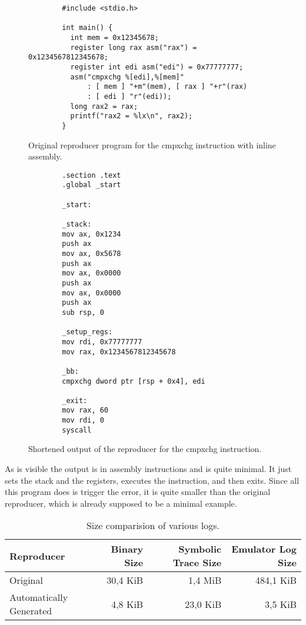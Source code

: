 \begin{figure}[ht]
    \centering
    \begin{verbatim}
        #include <stdio.h>

        int main() {
          int mem = 0x12345678;
          register long rax asm("rax") = 0x1234567812345678;
          register int edi asm("edi") = 0x77777777;
          asm("cmpxchg %[edi],%[mem]"
              : [ mem ] "+m"(mem), [ rax ] "+r"(rax)
              : [ edi ] "r"(edi));
          long rax2 = rax;
          printf("rax2 = %lx\n", rax2);
        }
    \end{verbatim}
    \caption{Original reproducer program for the cmpxchg instruction with inline assembly.}
    \label{fig:c}
\end{figure}

\begin{figure}[ht]
    \centering
    \begin{verbatim}       
        .section .text
        .global _start
        
        _start:
        
        _stack:
        mov ax, 0x1234
        push ax
        mov ax, 0x5678
        push ax
        mov ax, 0x0000
        push ax
        mov ax, 0x0000
        push ax
        sub rsp, 0
        
        _setup_regs:
        mov rdi, 0x77777777
        mov rax, 0x1234567812345678
        
        _bb:
        cmpxchg dword ptr [rsp + 0x4], edi
        
        _exit:
        mov rax, 60
        mov rdi, 0
        syscall
    \end{verbatim}
    \caption{Shortened output of the reproducer for the cmpxchg instruction.}
    \label{fig:gas}
\end{figure}

As is visible the output is in assembly instructions and is quite minimal.
It just sets the stack and the registers, executes the instruction, and then exits.
Since all this program does is trigger the error, it is quite smaller than the original reproducer, which is already supposed to be a minimal example.

\begin{table}[htpb]
    \caption[Log size comparision]{Size comparision of various logs.}\label{tab:log}
    \centering
    \begin{tabular}{l r r r}
      \toprule
        Reproducer & Binary Size & Symbolic Trace Size & Emulator Log Size \\
      \midrule
        Original & 30,4 KiB & 1,4 MiB & 484,1 KiB \\
        Automatically Generated & 4,8 KiB & 23,0 KiB & 3,5 KiB \\
      \bottomrule
    \end{tabular}
\end{table}

